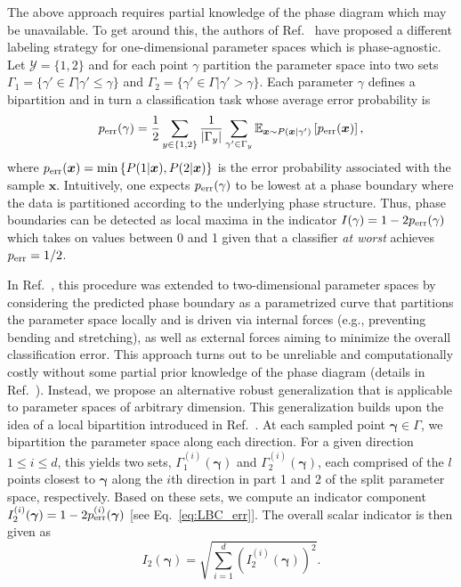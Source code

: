 \documentclass[twocolumn,aps,prl,superscriptaddress,tightlines,nofootinbib]{revtex4-2}
\begin{document}
\indent The above approach requires partial knowledge of the phase diagram which may be unavailable. To get around this, the authors of Ref.~\cite{van:2017} have proposed a different labeling strategy for one-dimensional parameter spaces which is phase-agnostic. Let $\mathcal{Y} = \{1,2\}$ and for each point $\gamma$ partition the parameter space into two sets $\Gamma_{1} = \{ \gamma' \in \Gamma 
 |\gamma' \leq \gamma\}$ and $\Gamma_{2} = \{ \gamma' \in \Gamma | \gamma' > \gamma\}$. Each parameter $\gamma$ defines a bipartition and in turn a classification task whose average error probability is
\begin{equation}\label{eq:LBC_err}
    p_{\rm err}(\gamma) = \frac{1}{2}\sum_{y \in \{1,2 \}} \frac{1}{|\Gamma_{y}|}\sum_{\gamma' \in \Gamma_{y}}\mathbb{E}_{\bm{x} \sim P(\bm{x}|\gamma')} \left[p_{\rm err}(\bm{x})\right],
\end{equation}
where $p_{\rm err}(\bm{x}) = {\rm min}\left\{ P(1|\bm{x}), P(2|\bm{x}) \right\}$ is the error probability associated with the sample $\bm{x}$. Intuitively, one expects $p_{\rm err}(\gamma)$ to be lowest at a phase boundary where the data is partitioned according to the underlying phase structure. Thus, phase boundaries can be detected as local maxima in the indicator $I(\gamma) =  1- 2 p_{\rm err}(\gamma)$ which takes on values between 0 and 1 given that a classifier \emph{at worst} achieves $p_{\rm err}=1/2$.

\indent In Ref.~\cite{liu:2018}, this procedure was extended to two-dimensional parameter spaces by considering the predicted phase boundary as a parametrized curve that partitions the parameter space locally and is driven via internal forces (e.g., preventing bending and stretching), as well as external forces aiming to minimize the overall classification error. This approach turns out to be unreliable and computationally costly without some partial prior knowledge of the phase diagram (details in Ref.~\cite{suppl}). Instead, we propose an alternative robust generalization that is applicable to parameter spaces of arbitrary dimension. This generalization builds upon the idea of a local bipartition introduced in Ref.~\cite{liu:2018}. At each sampled point $\bm{\gamma} \in \Gamma$, we bipartition the parameter space along each direction. For a given direction $1 \leq i \leq d$, this yields two sets, $\Gamma_{1}^{(i)}(\bm{\gamma})$ and $\Gamma_{2}^{(i)}(\bm{\gamma})$, each comprised of the $l$ points closest to $\bm{\gamma}$ along the $i$th direction in part 1 and 2 of the split parameter space, respectively. Based on these sets, we compute an indicator component $I_{2}^{(i)}(\bm{\gamma}) = 1 - 2 p_{\rm err}^{(i)}(\bm{\gamma})$ [see Eq.~\eqref{eq:LBC_err}]. The overall scalar indicator is then given as 
\begin{equation}\label{eq:ILBC}
    I_{2}(\bm{\gamma}) = \sqrt{\sum_{i=1}^{d} \left(I_{2}^{(i)}(\bm{\gamma})\right)^2 }.
\end{equation}
\end{document}
